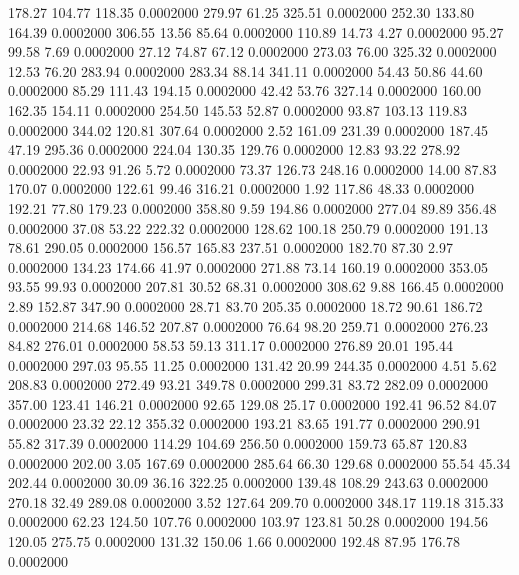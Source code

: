  178.27  104.77  118.35   0.0002000
 279.97   61.25  325.51   0.0002000
 252.30  133.80  164.39   0.0002000
 306.55   13.56   85.64   0.0002000
 110.89   14.73    4.27   0.0002000
  95.27   99.58    7.69   0.0002000
  27.12   74.87   67.12   0.0002000
 273.03   76.00  325.32   0.0002000
  12.53   76.20  283.94   0.0002000
 283.34   88.14  341.11   0.0002000
  54.43   50.86   44.60   0.0002000
  85.29  111.43  194.15   0.0002000
  42.42   53.76  327.14   0.0002000
 160.00  162.35  154.11   0.0002000
 254.50  145.53   52.87   0.0002000
  93.87  103.13  119.83   0.0002000
 344.02  120.81  307.64   0.0002000
   2.52  161.09  231.39   0.0002000
 187.45   47.19  295.36   0.0002000
 224.04  130.35  129.76   0.0002000
  12.83   93.22  278.92   0.0002000
  22.93   91.26    5.72   0.0002000
  73.37  126.73  248.16   0.0002000
  14.00   87.83  170.07   0.0002000
 122.61   99.46  316.21   0.0002000
   1.92  117.86   48.33   0.0002000
 192.21   77.80  179.23   0.0002000
 358.80    9.59  194.86   0.0002000
 277.04   89.89  356.48   0.0002000
  37.08   53.22  222.32   0.0002000
 128.62  100.18  250.79   0.0002000
 191.13   78.61  290.05   0.0002000
 156.57  165.83  237.51   0.0002000
 182.70   87.30    2.97   0.0002000
 134.23  174.66   41.97   0.0002000
 271.88   73.14  160.19   0.0002000
 353.05   93.55   99.93   0.0002000
 207.81   30.52   68.31   0.0002000
 308.62    9.88  166.45   0.0002000
   2.89  152.87  347.90   0.0002000
  28.71   83.70  205.35   0.0002000
  18.72   90.61  186.72   0.0002000
 214.68  146.52  207.87   0.0002000
  76.64   98.20  259.71   0.0002000
 276.23   84.82  276.01   0.0002000
  58.53   59.13  311.17   0.0002000
 276.89   20.01  195.44   0.0002000
 297.03   95.55   11.25   0.0002000
 131.42   20.99  244.35   0.0002000
   4.51    5.62  208.83   0.0002000
 272.49   93.21  349.78   0.0002000
 299.31   83.72  282.09   0.0002000
 357.00  123.41  146.21   0.0002000
  92.65  129.08   25.17   0.0002000
 192.41   96.52   84.07   0.0002000
  23.32   22.12  355.32   0.0002000
 193.21   83.65  191.77   0.0002000
 290.91   55.82  317.39   0.0002000
 114.29  104.69  256.50   0.0002000
 159.73   65.87  120.83   0.0002000
 202.00    3.05  167.69   0.0002000
 285.64   66.30  129.68   0.0002000
  55.54   45.34  202.44   0.0002000
  30.09   36.16  322.25   0.0002000
 139.48  108.29  243.63   0.0002000
 270.18   32.49  289.08   0.0002000
   3.52  127.64  209.70   0.0002000
 348.17  119.18  315.33   0.0002000
  62.23  124.50  107.76   0.0002000
 103.97  123.81   50.28   0.0002000
 194.56  120.05  275.75   0.0002000
 131.32  150.06    1.66   0.0002000
 192.48   87.95  176.78   0.0002000
